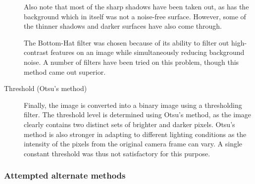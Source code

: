 \begin{description}
Also note that most of the sharp shadows have been taken out, as has the background which in itself was not a noise-free surface. However, some of the thinner shadows and darker surfaces have also come through.

The Bottom-Hat filter was chosen because of its ability to filter out high-contrast features on an image while simultaneously reducing background noise. A number of filters have been tried on this problem, though this method came out superior.

\item[Threshold (Otsu's method)] Finally, the image is converted into a binary image using a thresholding filter. The threshold level is determined using Otsu's method, as the image clearly contains two distinct sets of brighter and darker pixels. Otsu's method is also stronger in adapting to different lighting conditions as the intensity of the pixels from the original camera frame can vary. A single constant threshold was thus not satisfactory for this purpose.

\end{description}
\subsubsection{Attempted alternate methods}